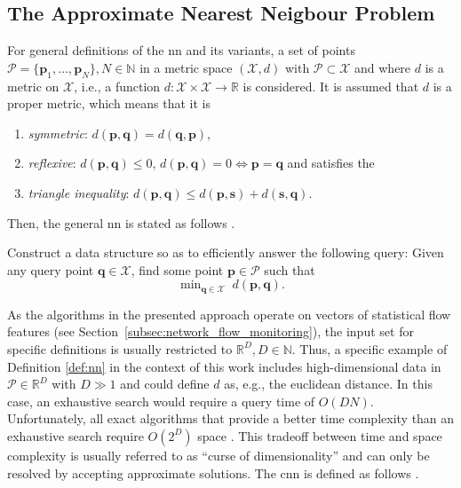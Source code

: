 \documentclass[../../../main.tex]{subfiles}
\begin{document}
\subsection{The Approximate Nearest Neigbour Problem}\label{subsec:approximate_nearest_neighbour_problem}

For general definitions of the \gls{nn} and its variants, a set of points $\mathcal{P} = \{\bm{p}_1, \dots, \bm{p}_N \}, N \in \mathbb{N}$ in a metric space $(\mathcal{X}, d)$ with $\mathcal{P} \subset \mathcal{X}$ and where $d$ is a metric on $\mathcal{X}$, i.e., a function $d: \mathcal{X} \times \mathcal{X} \rightarrow \mathbb{R}$ is considered. It is assumed that $d$ is a proper metric, which means that it is

\begin{enumerate}
    \item \textit{symmetric}: $d(\bm{p},\bm{q})=d(\bm{q},\bm{p})$,
    \item \textit{reflexive}: $d(\bm{p},\bm{q}) \leq 0$, $d(\bm{p},\bm{q})=0 \iff \bm{p}=\bm{q}$ and satisfies the 
    \item \textit{triangle inequality}: $d(\bm{p},\bm{q}) \leq d(\bm{p},\bm{s}) + d(\bm{s},\bm{q})$.
\end{enumerate}

Then, the general \gls{nn} is stated as follows \cite{indyk_approximate_1998}.

\begin{definition}[\Acrlong{nn}]\label{def:nn}
     Construct a data structure so as to efficiently answer the following query: Given any query point $\bm{q} \in \mathcal{X}$, find some point $\bm{p} \in \mathcal{P}$ such that
    \begin{equation}
        \mathop{\text{min}}_{\bm{q} \in \mathcal{X}} \; d(\bm{p}, \bm{q}).
    \end{equation}
\end{definition}

As the algorithms in the presented approach operate on vectors of statistical flow features (see Section~\ref{subsec:network_flow_monitoring}), the input set for specific definitions is usually restricted to $\mathbb{R}^D, D \in \mathbb{N}$. Thus, a specific example of Definition \ref{def:nn} in the context of this work includes high-dimensional data in $\mathcal{P} \in \mathbb{R}^D$ with $D \gg 1$ and could define $d$ as, e.g., the euclidean distance. In this case, an exhaustive search would require a query time of $O(DN)$. Unfortunately, all exact algorithms that provide a better time complexity than an exhaustive search require $O(2^D)$ space \cite{rubinstein2018hardness}. This tradeoff between time and space complexity is usually referred to as ``curse of dimensionality'' and can only be resolved by accepting approximate solutions. The \gls{cnn} is defined as follows \cite{indyk_approximate_1998}.
\end{document}

